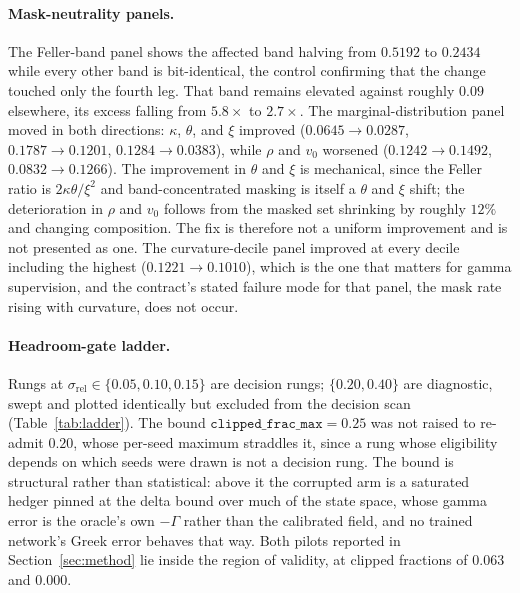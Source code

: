 \documentclass{article}
\begin{document}
\paragraph{Mask-neutrality panels.} The Feller-band panel shows the affected band
halving from $0.5192$ to $0.2434$ while every other band is bit-identical, the
control confirming that the change touched only the fourth leg. That band remains
elevated against roughly $0.09$ elsewhere, its excess falling from $5.8\times$ to
$2.7\times$. The marginal-distribution panel moved in both directions: $\kappa$,
$\theta$, and $\xi$ improved ($0.0645 \to 0.0287$, $0.1787 \to 0.1201$,
$0.1284 \to 0.0383$), while $\rho$ and $v_0$ worsened ($0.1242 \to 0.1492$,
$0.0832 \to 0.1266$). The improvement in $\theta$ and $\xi$ is mechanical, since the
Feller ratio is $2\kappa\theta/\xi^{2}$ and band-concentrated masking is itself a
$\theta$ and $\xi$ shift; the deterioration in $\rho$ and $v_0$ follows from the
masked set shrinking by roughly $12\%$ and changing composition. The fix is
therefore not a uniform improvement and is not presented as one. The
curvature-decile panel improved at every decile including the highest
($0.1221 \to 0.1010$), which is the one that matters for gamma supervision, and the
contract's stated failure mode for that panel, the mask rate rising with curvature,
does not occur.

\paragraph{Headroom-gate ladder.} Rungs at
$\sigma_{\mathrm{rel}} \in \{0.05, 0.10, 0.15\}$ are decision rungs;
$\{0.20, 0.40\}$ are diagnostic, swept and plotted identically but excluded from the
decision scan (Table~\ref{tab:ladder}). The bound
$\texttt{clipped\_frac\_max} = 0.25$ was not raised to re-admit $0.20$, whose
per-seed maximum straddles it, since a rung whose eligibility depends on which seeds
were drawn is not a decision rung. The bound is structural rather than statistical:
above it the corrupted arm is a saturated hedger pinned at the delta bound over much
of the state space, whose gamma error is the oracle's own $-\Gamma$ rather than the
calibrated field, and no trained network's Greek error behaves that way. Both pilots
reported in Section~\ref{sec:method} lie inside the region of validity, at clipped
fractions of $0.063$ and $0.000$.
\end{document}
